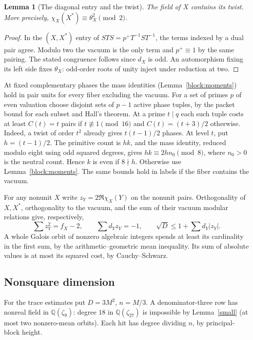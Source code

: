 \documentclass[11pt]{amsart}
\numberwithin{equation}{section}
\newtheorem{lemma}[theorem]{Lemma}
\theoremstyle{definition}
\theoremstyle{plain}
\newcommand{\QQ}{\mathbb Q}
\begin{document}
\begin{lemma}[The diagonal entry and the twist]\label{odd:diagonal-twist}
The field of $X$ contains its twist. More precisely,
$\chi_X(X^*)\equiv\theta_X^2\pmod2$.
\end{lemma}
\begin{proof}
In the $(X,X^*)$ entry of $STS=p^+T^{-1}ST^{-1}$, the terms indexed by a
dual pair agree. Modulo two the vacuum is the only term and $p^+\equiv1$ by
the same pairing. The stated congruence follows since $d_X$ is odd.
An automorphism fixing its left side fixes $\theta_X$: odd-order roots
of unity inject under reduction at two.
\end{proof}

At fixed complementary phases the mass identities
(Lemma~\ref{block:moments}) hold in pair units for every fiber excluding the
vacuum. For a set of primes $p$ of even valuation choose disjoint sets of
$p-1$ active phase tuples, by the packet bound for each subset and Hall's
theorem. At a prime $t\mid q$ each such tuple costs at least
$C(t)=t$ pairs if $t\not\equiv1\pmod {16}$ and $C(t)=(t+3)/2$ otherwise.
Indeed, a twist of order $t^2$ already gives $t(t-1)/2$ phases. At level $t$,
put $h=(t-1)/2$. The primitive count is $hk$, and the mass identity,
reduced modulo eight using odd squared degrees, gives $hk\equiv2h n_0\pmod8$,
where $n_0>0$ is the neutral count. Hence $k$ is even if $8\nmid h$.
Otherwise use Lemma~\ref{block:moments}. The same bounds hold in labels if
the fiber contains the vacuum.

For any nonunit $X$ write $z_Y=2\Re\chi_X(Y)$ on the nonunit pairs.
Orthogonality of $X,X^*$, orthogonality to the vacuum, and the sum of their
vacuum modular relations give, respectively,
\begin{equation}\label{odd:pair}
 \sum z_Y^2=f_X-2,\qquad \sum d_Y z_Y=-1,\qquad
 \sqrt D\le1+\sum d_Y|z_Y|.
\end{equation}
A whole Galois orbit of nonzero algebraic integers spends at least its
cardinality in the first sum, by the arithmetic--geometric mean inequality.
Its sum of absolute values is at most its squared cost, by Cauchy--Schwarz.

\subsection{Nonsquare dimension}
For the trace estimates put $D=3M^2$, $n=M/3$. A denominator-three row has
nonreal field in $\QQ(\zeta_9)$: degree $18$ in $\QQ(\zeta_{27})$ is
impossible by Lemma~\ref{small} (at most two nonzero-mean
orbits). Each hit has degree dividing $n$, by principal-block height.
\end{document}
